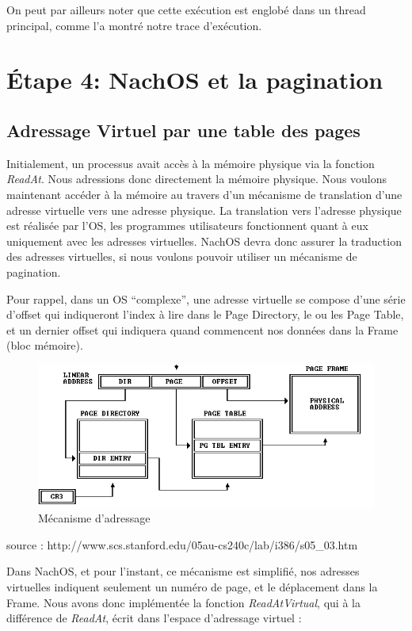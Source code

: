 \documentclass[a4paper,10pt]{article}
\begin{document}
On peut par ailleurs noter que cette exécution est englobé dans un thread principal, comme l'a montré notre trace d'exécution.
\newpage
\section{Étape 4: NachOS et la pagination }
\subsection{Adressage Virtuel par une table des pages}
Initialement, un processus avait accès à la mémoire physique via la fonction \textit{ReadAt}.
Nous adressions donc directement la mémoire physique. Nous voulons maintenant accéder à la mémoire au travers d'un mécanisme de translation d'une adresse virtuelle vers une adresse physique.
La translation vers l'adresse physique est réalisée par l'OS, les programmes utilisateurs fonctionnent quant à eux uniquement avec les adresses virtuelles. NachOS devra donc assurer la traduction des adresses
virtuelles, si nous voulons pouvoir utiliser un mécanisme de pagination.

Pour rappel, dans un OS ``complexe'', une adresse virtuelle se compose d'une série d'offset qui indiqueront l'index à lire dans le Page Directory, le ou les Page Table, et un dernier offset qui indiquera quand commencent
nos données dans la Frame (bloc mémoire).

\begin{figure}[h]
  \begin{center}
    \includegraphics[scale=0.39]{./pgtable.png}
   \caption{\label{pgtable}Mécanisme d'adressage}
  \end{center}
\end{figure}
source : http://www.scs.stanford.edu/05au-cs240c/lab/i386/s05\_03.htm
\vspace{0.5cm}

Dans NachOS, et pour l'instant, ce mécanisme est simplifié, nos adresses virtuelles indiquent seulement un numéro de page, et le déplacement dans la Frame.
Nous avons donc implémentée la fonction \textit{ReadAtVirtual}, qui à la différence de \textit{ReadAt}, écrit dans l'espace d'adressage virtuel :
\end{document}

